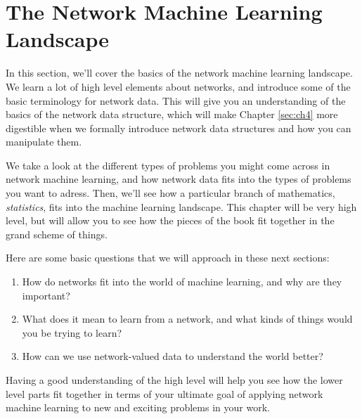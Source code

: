 \chapter{The Network Machine Learning Landscape}
\label{sec:ch1}

In this section, we'll cover the basics of the network machine learning landscape. We learn a lot of high level elements about networks, and introduce some of the basic terminology for network data. This will give you an understanding of the basics of the network data structure, which will make Chapter \ref{sec:ch4} more digestible when we formally introduce network data structures and how you can manipulate them. 

We take a look at the different types of problems you might come across in network machine learning, and how network data fits into the types of problems you want to adress. Then, we'll see how a particular branch of mathematics,  \emph{statistics}, fits into the machine learning landscape. This chapter will be very high level, but will allow you to see how the pieces of the book fit together in the grand scheme of things. 

Here are some basic questions that we will approach in these next sections:
\begin{enumerate}
    \item How do networks fit into the world of machine learning, and why are they important?
    \item What does it mean to learn from a network, and what kinds of things would you be trying to learn?
    \item How can we use network-valued data to understand the world better?
\end{enumerate}

Having a good understanding of the high level will help you see how the lower level parts fit together in terms of your ultimate goal of applying network machine learning to new and exciting problems in your work. 

\newpage 


% 





